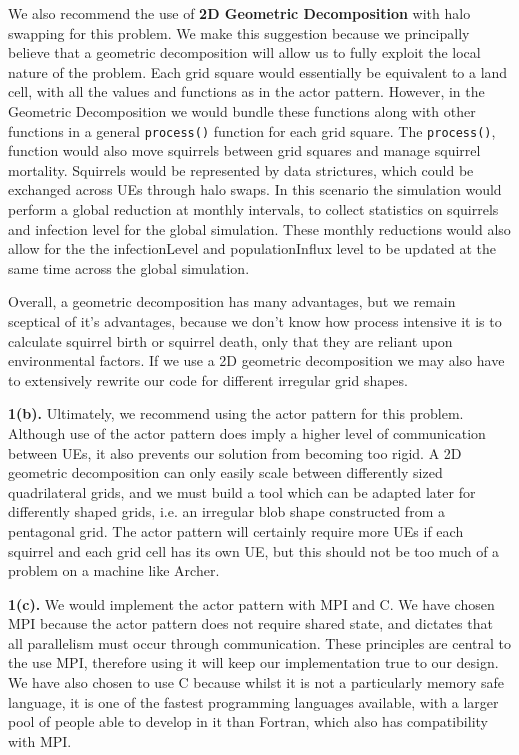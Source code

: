 \documentclass{article}
\begin{document}
We also recommend the use of \textbf{2D Geometric Decomposition} with halo swapping for this problem. We make this suggestion because we principally believe that a geometric decomposition will allow us to fully exploit the local nature of the problem. Each grid square would essentially be equivalent to a land cell, with all the values and functions as in the actor pattern. However, in the Geometric Decomposition we would bundle these functions along with other functions in a general \texttt{process()} function for each grid square. The \texttt{process()}, function would also move squirrels between grid squares and manage squirrel mortality. Squirrels would be represented by data strictures, which could be exchanged across UEs through halo swaps. In this scenario the simulation would perform a global reduction at monthly intervals, to collect statistics on squirrels and infection level for the global simulation. These monthly reductions would also allow for the the infectionLevel and populationInflux level to be updated at the same time across the global simulation.

Overall, a geometric decomposition has many advantages, but we remain sceptical of it's advantages, because we don't know how process intensive it is to calculate squirrel birth or squirrel death, only that they are reliant upon environmental factors. If we use a 2D geometric decomposition we may also have to extensively rewrite our code for different irregular grid shapes.  \newline

\noindent\textbf{1(b).} \newline
Ultimately, we recommend using the actor pattern for this problem. Although use of the actor pattern does imply a higher level of communication between UEs, it also prevents our solution from becoming too rigid. A 2D geometric decomposition can only easily scale between differently sized quadrilateral grids, and we must build a tool which can be adapted later for differently shaped grids, i.e. an irregular blob shape constructed from a pentagonal grid. The actor pattern will certainly require more UEs if each squirrel and each grid cell has its own UE, but this should not be too much of a problem on a machine like Archer. \newline

\noindent\textbf{1(c).} \newline
We would implement the actor pattern with MPI and C. We have chosen MPI because the actor pattern does not require shared state, and dictates that all parallelism must occur through communication. These principles are central to the use MPI, therefore using it will keep our implementation true to our design. We have also chosen to use C because whilst it is not a particularly memory safe language, it is one of the fastest programming languages available, with a larger pool of people able to develop in it than Fortran, which also has compatibility with MPI.
\end{document}
